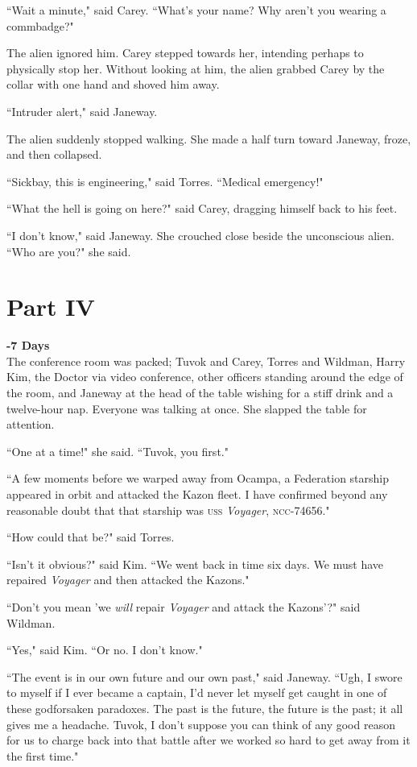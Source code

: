 \documentclass[twoside,letterpaper,12pt]{memoir}
\begin{document}
``Wait a minute," said Carey. ``What's your name? Why aren't you wearing a commbadge?"

The alien ignored him. Carey stepped towards her, intending perhaps to physically stop her. Without looking at him, the alien grabbed Carey by the collar with one hand and shoved him away.

``Intruder alert," said Janeway.

The alien suddenly stopped walking. She made a half turn toward Janeway, froze, and then collapsed.

``Sickbay, this is engineering," said Torres. ``Medical emergency!"

``What the hell is going on here?" said Carey, dragging himself back to his feet.

``I don't know," said Janeway. She crouched close beside the unconscious alien. ``Who are you?" she said.

\chapter*{Part IV}

\noindent\textbf{-7 Days}\\

The conference room was packed; Tuvok and Carey, Torres and Wildman, Harry Kim, the Doctor via video conference, other officers standing around the edge of the room, and Janeway at the head of the table wishing for a stiff drink and a twelve-hour nap. Everyone was talking at once. She slapped the table for attention. 

``One at a time!" she said. ``Tuvok, you first." 

``A few moments before we warped away from Ocampa, a Federation starship appeared in orbit and attacked the Kazon fleet. I have confirmed beyond any reasonable doubt that that starship was \textsc{uss} \textit{Voyager}, \textsc{ncc}-74656." 

``How could that be?" said Torres. 

``Isn't it obvious?" said Kim. ``We went back in time six days. We must have repaired \textit{Voyager} and then attacked the Kazons." 

``Don't you mean 'we \textit{will} repair \textit{Voyager} and attack the Kazons'?" said Wildman. 

``Yes," said Kim. ``Or no. I don't know." 

``The event is in our own future and our own past," said Janeway. ``Ugh, I swore to myself if I ever became a captain, I'd never let myself get caught in one of these godforsaken paradoxes. The past is the future, the future is the past; it all gives me a headache. Tuvok, I don't suppose you can think of any good reason for us to charge back into that battle after we worked so hard to get away from it the first time." 
\end{document}
